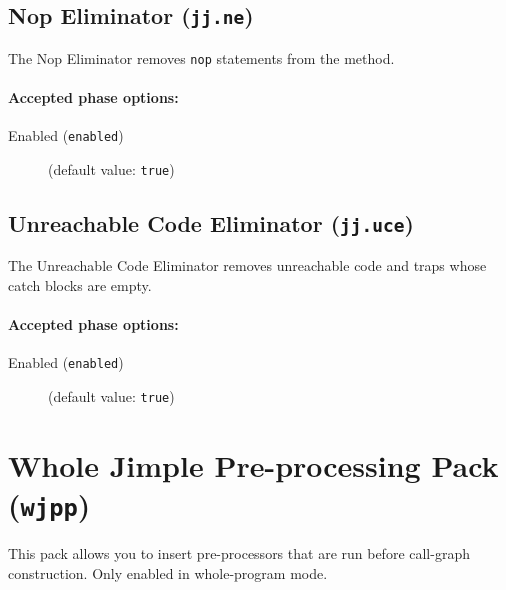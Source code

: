 \documentclass{article}
\begin{document}
\subsection{Nop Eliminator ({\tt jj.ne})}

The Nop Eliminator removes {\tt nop} statements from the method.


\paragraph{Accepted phase options:} 

\begin{description}

\item[Enabled ({\tt enabled})]
(default value: {\tt true})






\end{description}

\subsection{Unreachable Code Eliminator ({\tt jj.uce})}

The Unreachable Code Eliminator removes unreachable code and
traps whose catch blocks are empty.


\paragraph{Accepted phase options:} 

\begin{description}

\item[Enabled ({\tt enabled})]
(default value: {\tt true})






\end{description}

\section{Whole Jimple Pre-processing Pack ({\tt wjpp})}


\par

This pack allows you to insert pre-processors that are run before
call-graph construction. Only enabled in whole-program mode.

\par
\end{document}
